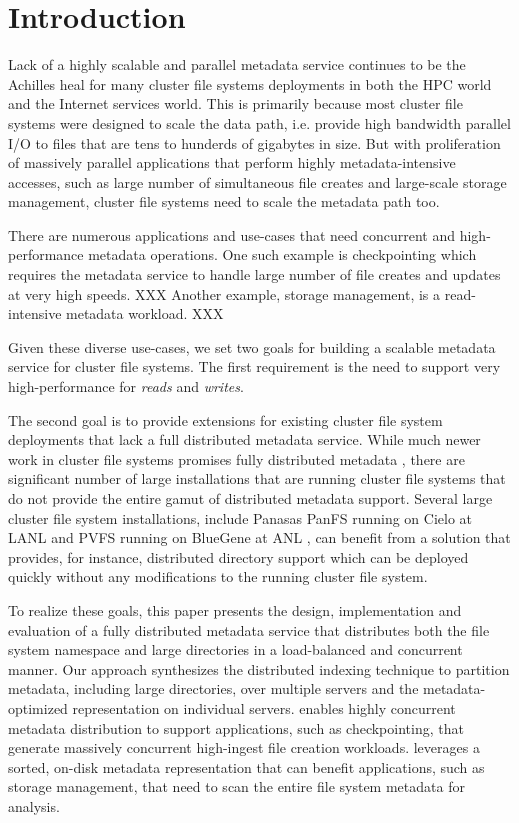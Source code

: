 \section{Introduction}

Lack of a highly scalable and parallel metadata service continues to be the 
Achilles heal for many cluster file systems deployments in both the HPC world 
and the Internet services world.
This is primarily because most cluster file systems were designed to scale the
data path, i.e. provide high bandwidth parallel I/O to files that are tens to
hunderds of gigabytes in size.
But with proliferation of massively parallel applications that perform highly
metadata-intensive accesses, such as large number of simultaneous file creates
and large-scale storage management, cluster file systems need to scale the
metadata path too.

There are numerous applications and use-cases that need concurrent and 
high-performance metadata operations.
One such example is checkpointing which requires the metadata service to
handle large number of file creates and updates at very high speeds. XXX 
Another example, storage management, is a read-intensive metadata workload. XXX

Given these diverse use-cases, we set two goals for building a scalable
metadata service for cluster file systems. The first requirement
is the need to support very high-performance for \textit{reads} and
\textit{writes}.

The second goal is to provide extensions for existing cluster file system
deployments that lack a full distributed metadata service.
While much newer work in cluster file systems promises fully distributed
metadata \cite{ceph:weil06}, there are significant number of large
installations that are running cluster file systems that do not provide the
entire gamut of distributed metadata support.
Several large cluster file system installations, include Panasas PanFS running
on Cielo at LANL \cite{panfs-cielo} and PVFS running on BlueGene at ANL
\cite{pvfs-anl}, can benefit from a solution that provides, for instance,
distributed directory support which can be deployed quickly without any
modifications to the running cluster file system.

To realize these goals, this paper presents the design, implementation and
evaluation of a fully distributed metadata service that distributes both the
file system namespace and large directories in a load-balanced and concurrent
manner.
Our approach synthesizes the \giga{} distributed indexing technique to partition
metadata, including large directories, over multiple servers and the \tfs{}
metadata-optimized representation on individual servers.
\giga{} enables highly concurrent metadata distribution to support applications, 
such as checkpointing, that generate massively concurrent high-ingest file 
creation workloads.
\tfs{} leverages a sorted, on-disk metadata representation that can benefit
applications, such as storage management, that need to scan the entire file
system metadata for analysis. 

